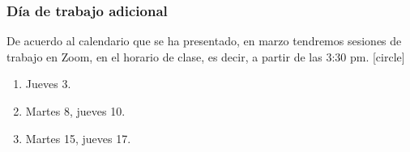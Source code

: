 \documentclass[12pt]{beamer}
\begin{document}
\begin{frame}
\frametitle{Día de trabajo adicional}
De acuerdo al calendario que se ha presentado, en marzo tendremos sesiones de trabajo en Zoom, en el horario de clase, es decir, a partir de las 3:30 pm.
\pause
{}
[circle]
\begin{enumerate}[<+->]
\item Jueves 3.
\item Martes 8, jueves 10. 
\item Martes 15, jueves 17.
\end{enumerate}
\end{frame}
\end{document}
